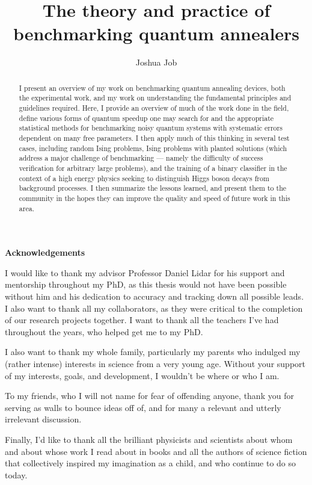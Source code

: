 \documentclass[10pt]{report}
\author{Joshua Job}
\title{The theory and practice of benchmarking quantum annealers}
\makeatletter
\newcommand\ackname{Acknowledgements}
\newenvironment{acknowledgements}{%
       \titlepage
       \null\vfil
       \@beginparpenalty\@lowpenalty
       \begin{center}%
         \bfseries \ackname
         \@endparpenalty\@M
       \end{center}}%
      {\par\vfil\null\endtitlepage}
\newenvironment{acknowledgements}{%
       \if@twocolumn
         \section*{\abstractname}%
       \else
         \small
         \begin{center}%
           {\bfseries \ackname\vspace{-.5em}\vspace{\z@}}%
         \end{center}%
         \quotation
       \fi}
       {\if@twocolumn\else\endquotation\fi}
\makeatother
\begin{document}
\flushbottom
\maketitle
\begin{abstract}
   I present an overview of my work on benchmarking quantum annealing devices, both the experimental work, and my work on understanding the fundamental principles and guidelines required. Here, I provide an overview of much of the work done in the field, define various forms of quantum speedup one may search for and the appropriate statistical methods for benchmarking noisy quantum systems with systematic errors dependent on many free parameters. I then apply much of this thinking in several test cases, including random Ising problems, Ising problems with planted solutions (which address a major challenge of benchmarking --- namely the difficulty of success verification for arbitrary large problems), and the training of a binary classifier in the context of a high energy physics seeking to distinguish Higgs boson decays from background processes. I then summarize the lessons learned, and present them to the community in the hopes they can improve the quality and speed of future work in this area.
\end{abstract}

\begin{acknowledgements}
I would like to thank my advisor Professor Daniel Lidar for his support and mentorship throughout my PhD, as this thesis would not have been possible without him and his dedication to accuracy and tracking down all possible leads. I also want to thank all my collaborators, as they were critical to the completion of our research projects together. I want to thank all the teachers I've had throughout the years, who helped get me to my PhD.

I also want to thank my whole family, particularly my parents who indulged my (rather intense) interests in science from a very young age. Without your support of my interests, goals, and development, I wouldn't be where or who I am.

To my friends, who I will not name for fear of offending anyone, thank you for serving as walls to bounce ideas off of, and for many a relevant and utterly irrelevant discussion.

Finally, I'd like to thank all the brilliant physicists and scientists about whom and about whose work I read about in books and all the authors of science fiction that collectively inspired my imagination as a child, and who continue to do so today.
\end{acknowledgements}
\tableofcontents
\listoffigures
\listoftables
\end{document}
